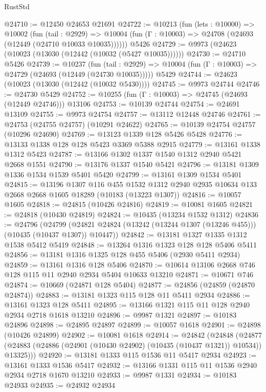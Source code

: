 \begin{lexlean}{RustStd}
\begin{coremodule}
@24710 := @12450 @24653 @21691
@24722 := @10213
    (fun (lets : @10000) =>
    @10002
      (fun (tail : @2929) =>
      @10004 (fun (Γ : @10003) => @24708 (@24693 (@12449 (@24710 @10033 @10035))))))
    @5426
@24729 := @9973 (@24623 (@10023 (@13030 (@12442 (@10032 (@5427 @10035))))))
@24730 := @24710 @5426
@24739 := @10237
    (fun (tail : @2929) => @10004 (fun (Γ : @10003) => @24729 (@24693 (@12449 (@24730 @10035)))))
    @5429
@24744 := @24623 (@10023 (@13030 (@12442 (@10032 @5430))))
@24745 := @9973 @24744
@24746 := @24730 @5429
@24752 := @10255 (fun (Γ : @10003) => @24745 (@24693 (@12449 @24746))) @13106
@24753 := @10139 @24744
@24754 := @24691 @13109
@24755 := @9973 @24754
@24757 := @13112 @12448 @24746
@24761 := @24753 (@24755 @24757) (@10291 @24622)
@24765 := @10139 @24754 @24757 (@10296 @24690)
@24769 := @13123 @1339 @128 @5426 @5428
@24776 := @13133 @1338 @128 @128 @5423 @3369 @5388 @2915
@24779 := @13161 @1338 @1312 @5423
@24787 := @13166 @1302 @1337 @1540 @1312 @2940 @5421 @2668 @1551
@24790 := @13176 @1337 @1540 @5421
@24796 := @13181 @1309 @1336 @1534 @1539 @5401 @5420
@24799 := @13161 @1309 @1534 @5401
@24815 := @13196
    @1307
    @116
    @455
    @1532
    @1312
    @2940
    @2935
    @10634
    @133
    @2668
    @2668
    @1605
    @18289
    (@10183 (@13223 @1307))
@24816 := @10057 @1605
@24818 := @24815 (@10426 @24816)
@24819 := @10081 @1605
@24821 := @24818 (@10430 @24819)
@24824 := @10435 (@13234 @1532 @1312)
@24836 := @24796
    (@24799 (@24821 @24824 (@13242 (@13244 @1307 (@13246 @455))) (@10435 (@10437 @1307)) @10447))
@24842 := @13181 @1327 @1335 @1312 @1538 @5412 @5419
@24848 := @13264 @1316 @1323 @128 @128 @5406 @5411
@24856 := @13181 @1316 @1325 @128 @455 @5406 (@2930 @5411 @2934)
@24859 := @13161 @1316 @128 @5406
@24870 := @10614 @13106 @2668 @746 @128 @115 @11 @2940 @2934 @5404 @10633 @13210
@24871 := @10671 @746
@24874 := @10669 (@24871 @128 @5404)
@24877 := @24856 (@24859 (@24870 @24874))
@24883 := @13181 @1323 @115 @128 @11 @5411 @2934
@24886 := @13161 @1323 @128 @5411
@24895 := @13166 @1321 @115 @11 @128 @2940 @2934 @2718 @1618 @13210
@24896 := @9987 @1321
@24897 := @10183 @24896
@24898 := @24895 @24897
@24899 := @10057 @1618
@24901 := @24898 (@10426 @24899)
@24902 := @10081 @1618
@24914 := @24842
    (@24848
      (@24877 (@24883 (@24886 (@24901 (@10430 @24902) (@10435 (@10437 @1321)) @10534)) @13325)))
@24920 := @13181 @1333 @115 @1536 @11 @5417 @2934
@24923 := @13161 @1333 @1536 @5417
@24932 := @13166 @1331 @115 @11 @1536 @2940 @2934 @2718 @1670 @13210
@24933 := @9987 @1331
@24934 := @10183 @24933
@24935 := @24932 @24934

\end{coremodule}
\end{lexlean}
